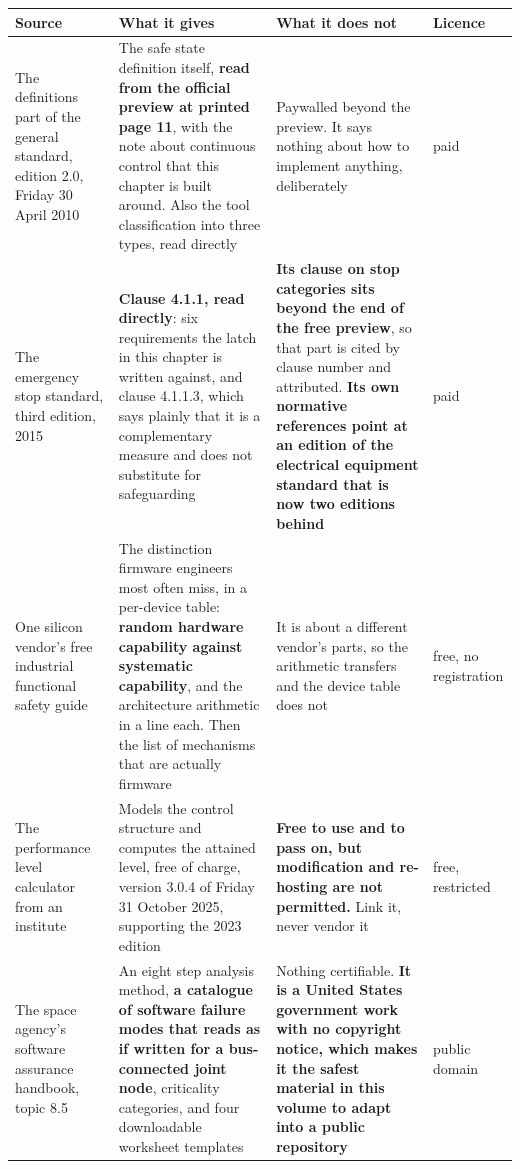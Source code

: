 \begin{table}[H]\centering\small
\begin{tabular}{p{34mm}p{46mm}p{38mm}p{20mm}}
\toprule
Source & What it gives & What it does not & Licence \\
\midrule
The definitions part of the general standard, edition 2.0, Friday 30 April 2010 & The safe
state definition itself, \textbf{read from the official preview at printed page
11}, with the note about continuous control that this chapter is built around.
Also the tool classification into three types, read directly & Paywalled beyond
the preview. It says nothing about how to implement anything, deliberately &
paid \\
The emergency stop standard, third edition, 2015 & \textbf{Clause 4.1.1, read
directly}: six requirements the latch in this chapter is written against, and
clause 4.1.1.3, which says plainly that it is a complementary measure and does
not substitute for safeguarding & \textbf{Its clause on stop categories sits
beyond the end of the free preview}, so that part is cited by clause number and
attributed. \textbf{Its own normative references point at an edition of the
electrical equipment standard that is now two editions behind} & paid \\
One silicon vendor's free industrial functional safety guide & The distinction
firmware engineers most often miss, in a per-device table: \textbf{random
hardware capability against systematic capability}, and the architecture
arithmetic in a line each. Then the list of mechanisms that are actually
firmware & It is about a different vendor's parts, so the arithmetic transfers
and the device table does not & free, no registration \\
The performance level calculator from an institute & Models the control structure
and computes the attained level, free of charge, version 3.0.4 of Friday 31
October 2025, supporting the 2023 edition & \textbf{Free to use and to pass on,
but modification and re-hosting are not permitted.} Link it, never vendor it &
free, restricted \\
The space agency's software assurance handbook, topic 8.5 & An eight step
analysis method, \textbf{a catalogue of software failure modes that reads as if
written for a bus-connected joint node}, criticality categories, and four
downloadable worksheet templates & Nothing certifiable. \textbf{It is a United
States government work with no copyright notice, which makes it the safest
material in this volume to adapt into a public repository} & public domain \\

\end{tabular}
\end{table}
